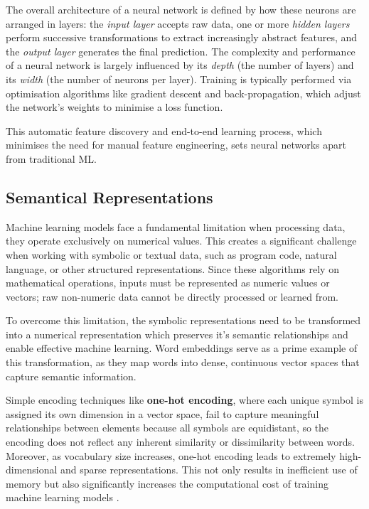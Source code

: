 The overall architecture of a neural network is defined by how these neurons are arranged in layers: the \textit{input layer} accepts raw data, one or more \textit{hidden layers} perform successive transformations to extract increasingly abstract features, and the \textit{output layer} generates the final prediction. The complexity and performance of a neural network is largely influenced by its \textit{depth} (the number of layers) and its \textit{width} (the number of neurons per layer). Training is typically performed via optimisation algorithms like gradient descent and back-propagation, which adjust the network’s weights to minimise a loss function.

This automatic feature discovery and end-to-end learning process, which minimises the need for manual feature engineering, sets neural networks apart from traditional ML.

\subsection{Semantical Representations} \label{subsection:SemanticalRepresentations}
Machine learning models face a fundamental limitation when processing data, they operate exclusively on numerical values. This creates a significant challenge when working with symbolic or textual data, such as program code, natural language, or other structured representations. Since these algorithms rely on mathematical operations, inputs must be represented as numeric values or vectors; raw non-numeric data cannot be directly processed or learned from.

To overcome this limitation, the symbolic representations need to be transformed into a numerical representation which preserves it's semantic relationships and enable effective machine learning. Word embeddings serve as a prime example of this transformation, as they map words into dense, continuous vector spaces that capture semantic information.

Simple encoding techniques like \textbf{one-hot encoding}, where each unique symbol is assigned its own dimension in a vector space, fail to capture meaningful relationships between elements because all symbols are equidistant, so the encoding does not reflect any inherent similarity or dissimilarity between words. Moreover, as vocabulary size increases, one-hot encoding leads to extremely high-dimensional and sparse representations. This not only results in inefficient use of memory but also significantly increases the computational cost of training machine learning models \cite{DeepLearningGoodfellow}.

